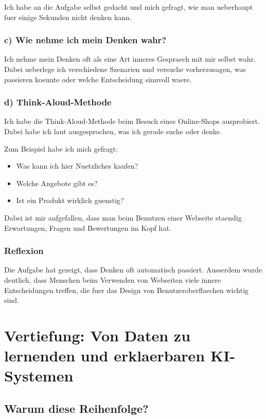 \documentclass[12pt,a4paper]{article}
\begin{document}
Ich habe an die Aufgabe selbst gedacht und mich gefragt,
wie man ueberhaupt fuer einige Sekunden nicht denken kann.

\subsubsection*{c) Wie nehme ich mein Denken wahr?}

Ich nehme mein Denken oft als eine Art inneres Gespraech mit mir selbst wahr.
Dabei ueberlege ich verschiedene Szenarien
und versuche vorherzusagen, was passieren koennte oder welche Entscheidung sinnvoll waere.

\subsubsection*{d) Think-Aloud-Methode}

Ich habe die Think-Aloud-Methode beim Besuch eines Online-Shops ausprobiert.
Dabei habe ich laut ausgesprochen, was ich gerade suche oder denke.

Zum Beispiel habe ich mich gefragt:

\begin{itemize}
    \item Was kann ich hier Nuetzliches kaufen?
    \item Welche Angebote gibt es?
    \item Ist ein Produkt wirklich guenstig?
    
\end{itemize}

Dabei ist mir aufgefallen,
dass man beim Benutzen einer Webseite staendig Erwartungen,
Fragen und Bewertungen im Kopf hat.

\subsubsection*{Reflexion}

Die Aufgabe hat gezeigt,
dass Denken oft automatisch passiert.
Ausserdem wurde deutlich,
dass Menschen beim Verwenden von Webseiten viele innere Entscheidungen treffen,
die fuer das Design von Benutzeroberflaechen wichtig sind.


\newpage
\section{Vertiefung: Von Daten zu lernenden und erklaerbaren KI-Systemen}

\subsection*{Warum diese Reihenfolge?}
\end{document}
